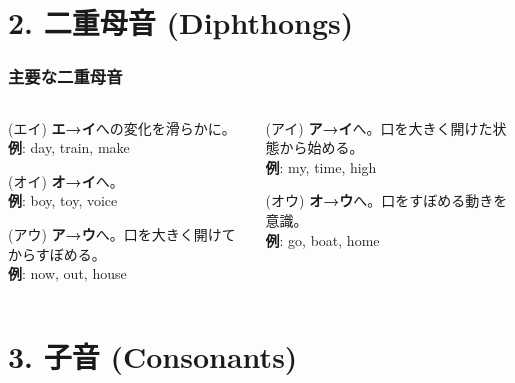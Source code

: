 \documentclass[aspectratio=169,xcolor={dvipsnames,table}]{beamer}
\begin{document}
\section{2. 二重母音 (Diphthongs)}

\begin{frame}
    \frametitle{主要な二重母音}
    \begin{columns}[T,totalwidth=\textwidth]
        \begin{column}{.45\textwidth}
            \begin{block}{ (エイ)}
                \textbf{エ→イ}への変化を滑らかに。\\ \textbf{例}: day, train, make
            \end{block}
            \begin{block}{ (オイ)}
                \textbf{オ→イ}へ。\\ \textbf{例}: boy, toy, voice
            \end{block}
            \begin{block}{ (アウ)}
                \textbf{ア→ウ}へ。口を大きく開けてからすぼめる。\\ \textbf{例}: now, out, house
            \end{block}
        \end{column}
        \begin{column}{.45\textwidth}
            \begin{block}{ (アイ)}
                \textbf{ア→イ}へ。口を大きく開けた状態から始める。\\ \textbf{例}: my, time, high
            \end{block}
            \begin{block}{ (オウ)}
                \textbf{オ→ウ}へ。口をすぼめる動きを意識。\\ \textbf{例}: go, boat, home
            \end{block}
        \end{column}
    \end{columns}
\end{frame}

\section{3. 子音 (Consonants)}
\end{document}
